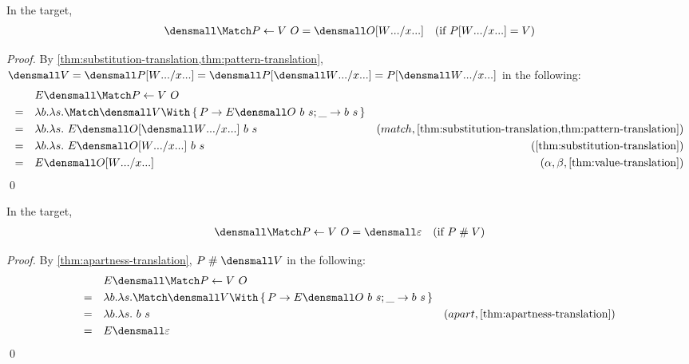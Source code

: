 \begin{lemma}
  \label{thm:try-match}
  In the target,
  \begin{align*}
   \den{\Match P \gets V ~ O} &= \den{O\subst{\many{x}}{\many{W}}}
   &(\text{if } P\subst{\many{x}}{\many{W}} = V) 
  \end{align*}
\end{lemma}
\begin{proof}
  By \cref{thm:substitution-translation,thm:pattern-translation},
  \begin{math}
    \den{V}
    =
    \den{P\subst{\many{x}}{\many{W}}}
    =
    \den{P}\subst{\many{x}}{\many{\den{W}}}
    =
    P\subst{\many{x}}{\many{\den{W}}}
  \end{math}
  in the following:
  \begin{align*}
    &\quad
    E\den{\Match P \gets V ~ O}
    \\
    =&\quad
    \lambda b. \lambda s. \Match \den{V} \With \set{P \to E\den{O}~b~s; \_ \to b~s}
    \\
    =&\quad
    \lambda b. \lambda s.~E\den{O}\subst{\many{x}}{\many{\den{W}}}~b~s
    & (match, \cref{thm:substitution-translation,thm:pattern-translation}) \\
    =& \quad
    \lambda b. \lambda s.~E\den{O\subst{\many{x}}{\many{W}}}~b~s
    & (\cref{thm:substitution-translation})
    \\
    =& \quad
    E\den{O\subst{\many{x}}{\many{W}}}
    & (\alpha, \beta, \cref{thm:value-translation})
  \end{align*}
  \qed
\end{proof}

\begin{lemma}
  \label{thm:try-match-apart}
  In the target,
  \begin{align*}
   \den{\Match P \gets V ~ O} &= \den{\varepsilon}
   &(\text{if } P \apart V) 
  \end{align*}
\end{lemma}
\begin{proof}
  By \cref{thm:apartness-translation}, $P \apart \den{V}$ in the following:
  \begin{align*}
    &\quad
    E\den{\Match P \gets V ~ O}
    \\
    =&\quad
    \lambda b. \lambda s. \Match \den{V} \With \set{P \to E\den{O}~b~s; \_ \to b~s}
    \\
    =&\quad
    \lambda b. \lambda s.~b~s
    & (apart, \cref{thm:apartness-translation})
    \\
    =& \quad
    E\den{\varepsilon}
  \end{align*}
  \qed
\end{proof}

